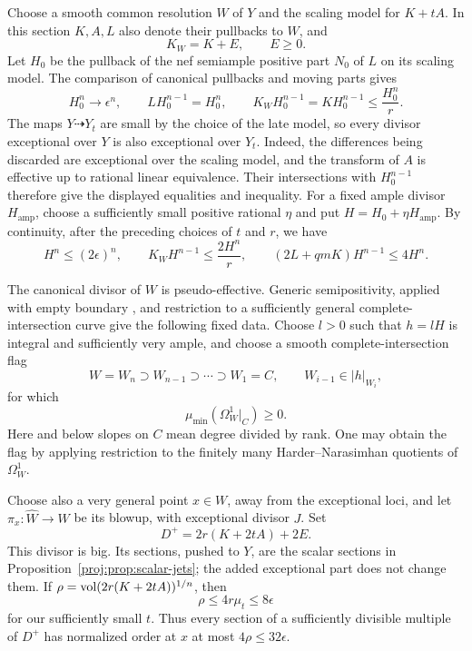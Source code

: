 Choose a smooth common resolution \(W\) of \(Y\) and the scaling model
for \(K+tA\). In this section \(K,A,L\) also denote their pullbacks to
\(W\), and
\[
 K_W=K+E,\qquad E\geq0.
\]
Let \(H_0\) be the pullback of the nef semiample positive part \(N_0\) of
\(L\) on its scaling model. The comparison of canonical pullbacks and
moving parts gives
\begin{equation}
\label{proj:fr:limit-intersections}
 H_0^n\longrightarrow\epsilon^n,\qquad
 LH_0^{n-1}=H_0^n,\qquad
 K_WH_0^{n-1}=KH_0^{n-1}\leq\frac{H_0^n}{r}.
\end{equation}
The maps \(Y\dashrightarrow Y_t\) are small by the choice of the late
model, so every divisor exceptional over \(Y\) is also exceptional
over \(Y_t\).
Indeed, the differences being discarded are exceptional over the
scaling model, and the transform of \(A\) is effective up to rational
linear equivalence. Their intersections with \(H_0^{n-1}\) therefore
give the displayed equalities and inequality. For a fixed ample divisor
\(H_{\mathrm{amp}}\), choose a sufficiently small positive rational
\(\eta\) and put \(H=H_0+\eta H_{\mathrm{amp}}\). By continuity, after
the preceding choices of \(t\) and \(r\), we have
\begin{equation}
\label{proj:fr:intersection-bounds}
 H^n\leq(2\epsilon)^n,\qquad
 K_WH^{n-1}\leq\frac{2H^n}{r},\qquad
 (2L+qmK)H^{n-1}\leq4H^n.
\end{equation}

The canonical divisor of \(W\) is pseudo-effective. Generic
semipositivity, applied with empty boundary
\cite[Theorem~2.1]{Proj-CampanaPaun2015}, and restriction to a sufficiently
general complete-intersection curve give the following fixed data.
Choose \(l>0\) such that \(h=lH\) is integral and sufficiently very
ample, and choose a smooth complete-intersection flag
\[
 W=W_n\supset W_{n-1}\supset\cdots\supset W_1=C,
 \qquad W_{i-1}\in |h|_{W_i},
\]
for which
\begin{equation}
\label{proj:fr:generic-nef}
 \mu_{\min}(\Omega_W^1|_C)\geq0.
\end{equation}
Here and below slopes on \(C\) mean degree divided by rank. One may
obtain the flag by applying restriction to the finitely many
Harder--Narasimhan quotients of \(\Omega_W^1\).

Choose also a very general point \(x\in W\), away from the exceptional
loci, and let \(\pi_x:\widehat W\to W\) be its blowup, with exceptional
divisor \(J\). Set
\[
 D^+=2r(K+2tA)+2E.
\]
This divisor is big. Its sections, pushed to \(Y\), are the scalar
sections in Proposition~\ref{proj:prop:scalar-jets}; the added exceptional
part does not change them. If
\(\rho=\operatorname{vol}(2r(K+2tA))^{1/n}\), then
\[
 \rho\leq4r\mu_t\leq8\epsilon
\]
for our sufficiently small \(t\). Thus every section of a sufficiently
divisible multiple of \(D^+\) has normalized order at \(x\) at most
\(4\rho\leq32\epsilon\).

